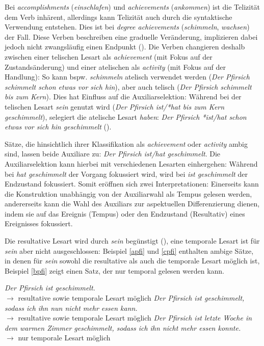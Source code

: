  
Bei \textit{accomplishments} (\textit{einschlafen}) und \textit{achievements} (\textit{ankommen}) ist die Telizität dem Verb inhärent, allerdings kann Telizität auch durch die syntaktische Verwendung entstehen. Dies ist bei \textit{degree achievements} (\textit{schimmeln}, \textit{wachsen}) der Fall. Diese Verben beschreiben eine graduelle Veränderung, implizieren dabei jedoch nicht zwangsläufig einen Endpunkt (\cites[88--90]{Dowty.1979}[37]{Gillmann.2016}). Die Verben changieren deshalb zwischen einer telischen Lesart als \textit{achievement} (mit Fokus auf der Zustandsänderung) und einer atelischen als \textit{activity} (mit Fokus auf der Handlung): So kann bspw. \textit{schimmeln} atelisch verwendet werden (\textit{Der Pfirsich schimmelt schon etwas vor sich hin}), aber auch telisch (\textit{Der Pfirsich schimmelt bis zum Kern}). Dies hat Einfluss auf die Auxiliarselektion: Während bei der telischen Lesart \textit{sein} genutzt wird (\textit{Der Pfirsich ist/*hat bis zum Kern geschimmelt}), selegiert die atelische Lesart \textit{haben}: \textit{Der Pfirsich *ist/hat schon etwas vor sich hin geschimmelt} (\cite[261]{Gillmann.2016}). 



Sätze, die hinsichtlich ihrer Klassifikation als \textit{achievement} oder \textit{activity} ambig sind, lassen beide Auxiliare zu: \textit{Der Pfirsich ist/hat geschimmelt}. Die Auxiliarselektion kann hierbei mit verschiedenen Lesarten einhergehen: Während bei \textit{hat geschimmelt} der Vorgang fokussiert wird, wird bei \textit{ist geschimmelt} der Endzustand fokussiert. Somit eröffnen sich zwei Interpretationen: Einerseits kann die Konstruktion unabhängig von der Auxiliarwahl als Tempus gelesen werden, andererseits  kann die Wahl des Auxiliars zur aspektuellen Differenzierung dienen, indem sie auf das Ereignis (Tempus) oder den Endzustand (Resultativ) eines Ereignisses fokussiert. 


Die resultative Lesart wird durch \textit{sein} begünstigt (\cite[131]{Gillmann.2016}), eine temporale Lesart ist für \textit{sein} aber nicht ausgeschlossen: Beispiel \ref{apfi} und \ref{cpfi} enthalten ambige Sätze, in denen für \textit{sein} sowohl die resultative als auch die temporale Lesart möglich ist, Beispiel \ref{bpfi} zeigt einen Satz, der nur temporal gelesen werden kann.

\begin{exe}
\ex \label{apfi} \textit{Der Pfirsich ist geschimmelt.} \\
$ \rightarrow $ resultative sowie temporale Lesart möglich
\ex \label{cpfi} \textit{Der Pfirsich ist geschimmelt, sodass ich ihn nun nicht mehr essen kann.} \\
$ \rightarrow$ resultative sowie temporale Lesart möglich
\ex \label{bpfi} \textit{Der Pfirsich ist letzte Woche in dem warmen Zimmer geschimmelt, sodass ich ihn nicht mehr essen konnte.}\\
$ \rightarrow$ nur temporale Lesart möglich 

\end{exe}

